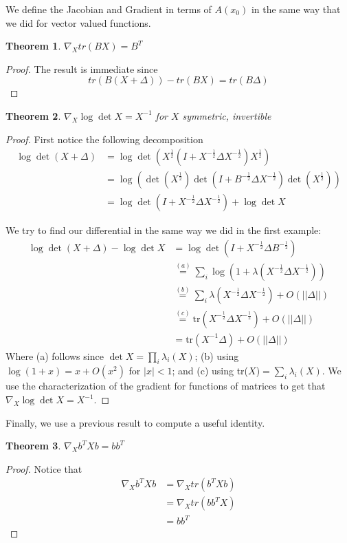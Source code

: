 \documentclass[]{article}
\theoremstyle{mattstyle}
\newtheorem{theorem}{Theorem}[section]
\theoremstyle{definition}
\begin{document}
We define the Jacobian and Gradient in terms of $A(x_0)$ in the same way that we did for vector valued functions.

\begin{theorem}
	$\nabla_{X} tr(BX) = B^T$
\end{theorem}
\begin{proof}
	The result is immediate since
	$$tr(B(X+\Delta)) - tr(BX) = tr(B\Delta)$$
\end{proof}

\begin{theorem}
	$\nabla_{X} \log \det X = X^{-1}$ for $X$ symmetric, invertible
\end{theorem}
\begin{proof}
	First notice the following decomposition
\begin{align*}
\log \det (X + \Delta) &= \log \det\left(X^{\frac{1}{2}}\left(I + X^{-\frac{1}{2}}\Delta X^{-\frac{1}{2}}\right)X^{\frac{1}{2}}\right)\\
&= \log\left(\det\left( X^{\frac{1}{2}}\right) \det\left(I + B^{-\frac{1}{2}}\Delta X^{-\frac{1}{2}}\right) \det\left(X^{\frac{1}{2}}\right) \right)\\
&=\log\det\left(I + X^{-\frac{1}{2}}\Delta X^{-\frac{1}{2}}\right)+\log\det X
\end{align*}

We try to find our differential in the same way we did in the first example:
\begin{align*}
\log \det (X + \Delta) - \log\det X &= \log\det\left(I + X^{-\frac{1}{2}}\Delta B^{-\frac{1}{2}}\right)\\
&\overset{(a)}{=} \sum_{i} \log\left(1 + \lambda\left(X^{-\frac{1}{2}}\Delta X^{-\frac{1}{2}}\right)\right)\\
&\overset{(b)}{=} \sum_{i}\lambda\left(X^{-\frac{1}{2}}\Delta X^{-\frac{1}{2}}\right) + O(||\Delta||)\\
&\overset{(c)}{=} \text{tr}\left(X^{-\frac{1}{2}}\Delta X^{-\frac{1}{2}}\right) + O(||\Delta||)\\
&= \text{tr}(X^{-1}\Delta) + O(||\Delta||)
\end{align*}
Where (a) follows since $\det X = \prod_i \lambda_i(X)$; (b) using $\log(1+x)=x+O(x^2)$ for $|x|<1$; and (c) using tr($X$)$=\sum_i \lambda_i(X)$. 
We use the characterization of the gradient for functions of matrices to get that $\nabla_X \log\det X = X^{-1}$.
\end{proof}
Finally, we use a previous result to compute a useful identity.
\begin{theorem}
	$\nabla_{X} b^TXb = bb^T$
\end{theorem}
\begin{proof}
	Notice that
	\begin{align*}
	\nabla_{X} b^TXb &= \nabla_{X} tr(b^TXb)\\
	&= \nabla_{X} tr(bb^TX)\\
	&= bb^T
	\end{align*}
\end{proof}
\end{document}

